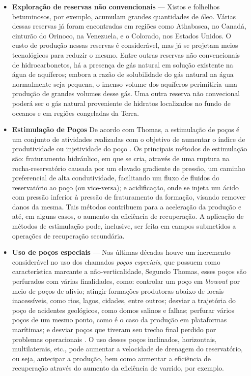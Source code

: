 \begin{itemize}
\item \textbf{Explora\c{c}\~{a}o de reservas n\~{a}o convencionais} --- Xistos e folhelhos betuminosos, por exemplo, acumulam grandes quantidades de \'{o}leo. V\'{a}rias dessas reservas j\'{a} foram encontradas em regi\~{o}es como Athabasca, no Canad\'{a}, cintur\~{a}o do Orinoco, na Venezuela, e o Colorado, nos Estados Unidos. O custo de produ\c{c}\~{a}o nessas reservas \'{e} consider\'{a}vel, mas j\'{a} se projetam meios tecnol\'{o}gicos para reduzir o mesmo. Entre outras reservas n\~{a}o convencionais de hidrocarbonetos, h\'{a} a presen\c{c}a de g\'{a}s natural em solu\c{c}\~{a}o existente na \'{a}gua de aqu\'{i}feros; embora a raz\~{a}o de solubilidade do g\'{a}s natural na \'{a}gua normalmente seja pequena, o imenso volume dos aqu\'{i}feros perimitiria uma produ\c{c}\~{a}o de grandes volumes desse g\'{a}s. Uma outra reserva n\~{a}o convecional poder\'{a} ser o g\'{a}s natural proveniente de hidratos localizados no fundo de oceanos e em regi\~{o}es congeladas da Terra.
\item \textbf{Estimula\c{c}\~{a}o de Po\c{c}os} De acordo com Thomas, a estimula\c{c}\~{a}o de po\c{c}os \'{e} um conjunto de atividades realizadas com o objetivo de aumentar o \'{i}ndice de produtividade ou injetividade do po\c{c}o \cite[p.~166]{engpetro}. Os principais m\'{e}todos de estimula\c{c}\~{a}o s\~{a}o: fraturamento hidr\'{a}ulico, em que se cria, atrav\'{e}s de uma ruptura na rocha-reservat\'{o}rio causada por um elevado gradiente de press\~{a}o, um caminho preferencial de alta condutividade, facilitando um fluxo de fluidos do reservat\'{o}rio ao po\c{c}o (ou vice-versa); e acidifica\c{c}\~{a}o, onde se injeta um \'{a}cido com press\~{a}o inferior \`{a} press\~{a}o de fraturamento da forma\c{c}\~{a}o, visando remover danos da mesma. Tais m\'{e}todos contribuem para a acelera\c{c}\~{a}o da produ\c{c}\~{a}o e at\'{e}, em alguns casos, o aumento da efici\^{e}ncia de recupera\c{c}\~{a}o. A aplica\c{c}\~{a}o de m\'{e}todos de estimula\c{c}\~{a}o pode, inclusive, ser feita em campos submetidos a opera\c{c}\~{o}es de recupera\c{c}\~{a}o secund\'{a}ria.
\item \textbf{Uso de po\c{c}os especiais} --- Nas \'{u}ltimas d\'{e}cadas houve um incremento consider\'{a}vel no uso dos chamados \textit{po\c{c}os especiais}, que possuem como caracter\'{i}stica marcante a n\~{a}o-verticalidade, Segundo Thomas, esses po\c{c}os s\~{a}o perfurados com v\'{a}rias finalidades, como: controlar um po\c{c}o em \textit{blowout} por meio de po\c{c}os de al\'{i}vio; atingir forma\c{c}\~{o}es produtoras abaixo de locais inacess\'{i}veis, como rios, lagos, cidades, entre outros; desviar a trajet\'{o}ria do po\c{c}o de acidentes geol\'{o}gicos, como domos salinos e falhas; perfurar v\'{a}rios po\c{c}os de um mesmo ponto, como \'{e} o caso da produ\c{c}\~{a}o em plataformas mar\'{i}timas; e desviar po\c{c}os que tiveram seu trecho final perdido por problemas operacionais \cite[p.~106]{engpetro}. O uso desses po\c{c}os inclinados, horizontais, multilaterais, etc., pode aumentar a velocidade de drenagem do reservat\'{o}rio, ou seja, antecipar a produ\c{c}\~{a}o, bem como aumentar a efici\^{e}ncia de recupera\c{c}\~{a}o atrav\'{e}s do aumento da efici\^{e}ncia de varrido, por exemplo.

\end{itemize}
